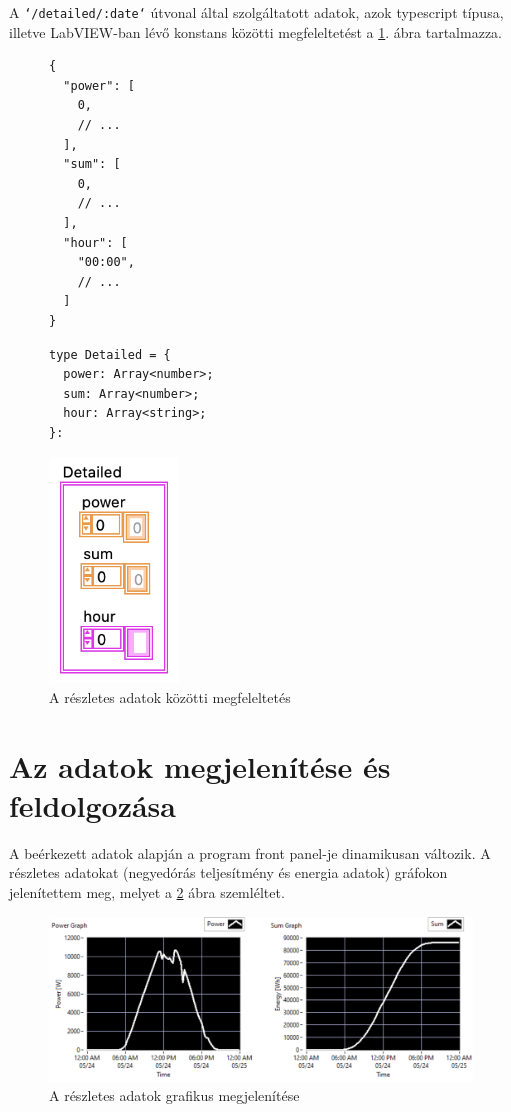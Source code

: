 A \texttt{`/detailed/:date`} útvonal által szolgáltatott adatok, azok typescript
típusa, illetve Lab\-VIEW-ban lévő konstans közötti megfeleltetést a
\ref{fig:detailed}. ábra tartalmazza.
\begin{figure}[H]
  \centering
  \begin{minipage}{.3\textwidth}
    \begin{verbatim}
{
  "power": [
    0,
    // ...
  ],
  "sum": [
    0,
    // ...
  ],
  "hour": [
    "00:00",
    // ...
  ]
}
    \end{verbatim}
  \end{minipage}\begin{minipage}{.3\textwidth}
    \begin{verbatim}
type Detailed = {
  power: Array<number>;
  sum: Array<number>;
  hour: Array<string>;
}:
    \end{verbatim}
  \end{minipage}\begin{minipage}{.3\textwidth}
    \flushright
    \includegraphics[height=6cm]{static/lv-detailed.png}
  \end{minipage}

  \caption{A részletes adatok közötti megfeleltetés}
  \label{fig:detailed}
\end{figure}

\section{Az adatok megjelenítése és feldolgozása}

A beérkezett adatok alapján a program front panel-je dinamikusan változik.
A részletes adatokat (negyedórás teljesítmény és energia adatok) gráfokon
jelenítettem meg, melyet a \ref{fig:graphs} ábra szemléltet.

\begin{figure}[ht]
  \centering
  \includegraphics[width=.7\textwidth]{static/windows-graph.png}
  \caption{A részletes adatok grafikus megjelenítése}
  \label{fig:graphs}
\end{figure}

